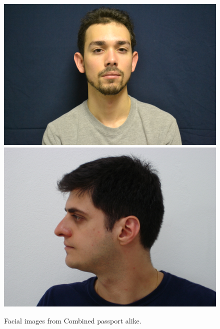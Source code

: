 %
\begin{figure}[h]
\centering
    \subfloat
        {\includegraphics[scale = 0.12]{figures/0.jpg}\hspace{0.42cm}}
    \subfloat
        {\includegraphics[scale = 0.185]{figures/50.jpg}\hspace{0.42cm}}
    \caption{Facial images from Combined passport alike.}
    \label{fig:combined_passport_alike}
\end{figure}
